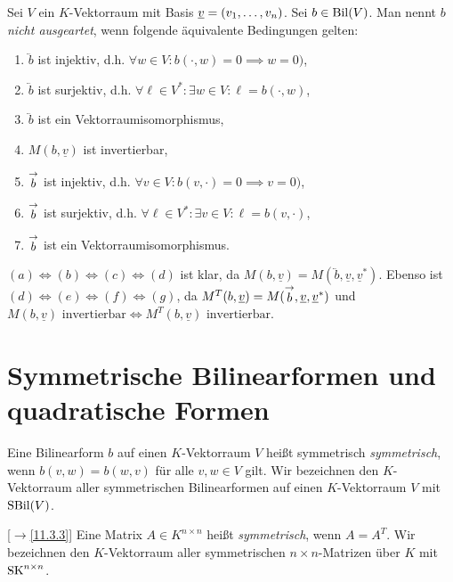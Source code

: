 \documentclass[../../main.tex]{subfiles}
\begin{document}
\begin{defprop}\label{13.3.11}
Sei $V$ ein $K$-Vektorraum mit Basis ${\underline v}=(v_1,\ldots ,v_n)$. Sei $b\in \operatorname{Bil}(V)$. Man nennt $b$ \emph{nicht ausgeartet}, wenn folgende äquivalente Bedingungen gelten:
\begin{enumerate}[\normalfont(a)]
\item $\lvec b$ ist injektiv, d.h. $\forall w\in V: b(\cdot, w)=0\implies w=0)$,
\item $\lvec b$ ist surjektiv, d.h. $\forall \ell\in V^*: \exists w\in V: \ell=b(\cdot,w)$,
\item $\lvec b$ ist ein Vektorraumisomorphismus,
\item $M(b,\underline{v})$ ist invertierbar,
\item $\stackrel{\rightarrow}{b}$ ist injektiv, d.h. $\forall v\in V: b(v, \cdot)=0\implies v=0)$,
\item $\stackrel{\rightarrow}{b}$ ist surjektiv, d.h. $\forall \ell\in V^*: \exists v\in V: \ell=b(v,\cdot)$,
\item $\stackrel{\rightarrow}{b}$ ist ein Vektorraumisomorphismus.
\end{enumerate}
\end{defprop}
\begin{cproof}
$(a)\Longleftrightarrow(b)\Longleftrightarrow(c)\Longleftrightarrow(d)$ ist klar, da $M(b,\underline{v})=M(\lvec b,\underline{v},\underline{v}^*)$. Ebenso ist $(d)\Longleftrightarrow(e)\Longleftrightarrow(f)\Longleftrightarrow(g)$, da $M^T(b,\underline{v})=M(\stackrel{\rightarrow}{b},\underline{v},\underline{v}^*)$ und $M(b,\underline{v})\text{ invertierbar}\Longleftrightarrow M^T(b,\underline{v})\text{ invertierbar}$.
\end{cproof}

\section{Symmetrische Bilinearformen und quadratische Formen}

\begin{df}\label{13.4.1}
Eine Bilinearform $b$ auf einen $K$-Vektorraum $V$ heißt symmetrisch \emph{symmetrisch}, wenn $b(v,w)=b(w,v)$ für alle $v,w\in V$ gilt. Wir bezeichnen den $K$-Vektorraum aller symmetrischen Bilinearformen auf einen $K$-Vektorraum $V$ mit $\operatorname{SBil}(V)$.
\end{df}	
	
\begin{df}\label{13.4.2}
[$\to$\ref{11.3.3}] Eine Matrix $A\in K^{n\times n}$ heißt \emph{symmetrisch}, wenn $A=A^T$. Wir bezeichnen den $K$-Vektorraum aller symmetrischen $n\times n$-Matrizen über $K$ mit $\operatorname{SK}^{n\times n}$.
\end{df}
	
\end{document}

